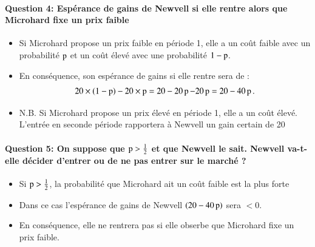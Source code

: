 \begin{frame}
[allowframebreaks]{\insertsection}
\framesubtitle{Question 4: 
Espérance de gains de Newvell si elle rentre alors que Microhard fixe un prix faible}
\begin{itemize}
  \item Si Microhard propose un prix faible en période 1, 
  elle a un coût faible avec un probabilité $\operatorname{p}$ et un coût élevé avec une probabilité $1 - \operatorname{p}$. 
  \item En conséquence, son espérance de gains si elle rentre sera de :
\begin{align*}
  20 \times (1 - \operatorname{p}) - 20 \times \operatorname{p} = 20 - 20\operatorname{p} -20\operatorname{p} = 20 - 40\operatorname{p}.
\end{align*}
\item N.B. Si Microhard propose un prix élevé en période 1, 
elle a un coût élevé. L’entrée en seconde période rapportera à Newvell un gain certain de 20
\end{itemize}
\end{frame}  
%
%
\begin{frame}
  [allowframebreaks]{\insertsection}
  \framesubtitle{Question 5: 
  On suppose que $\operatorname{p}> \frac{1}{2}$ et que Newvell le sait. 
  Newvell va-t-elle décider d’entrer ou de ne pas entrer sur le marché ?}
  \begin{itemize}
    \item Si $\operatorname{p} > \frac{1}{2}$, la probabilité que Microhard ait un coût faible est la plus forte
    \item Dans ce cas l’espérance de gains de Newvell $(20 - 40\operatorname{p})$ sera $< 0$. 
    \item En conséquence, elle ne rentrera pas si elle obserbe que Microhard fixe un prix faible.
  \end{itemize}
\end{frame}  

